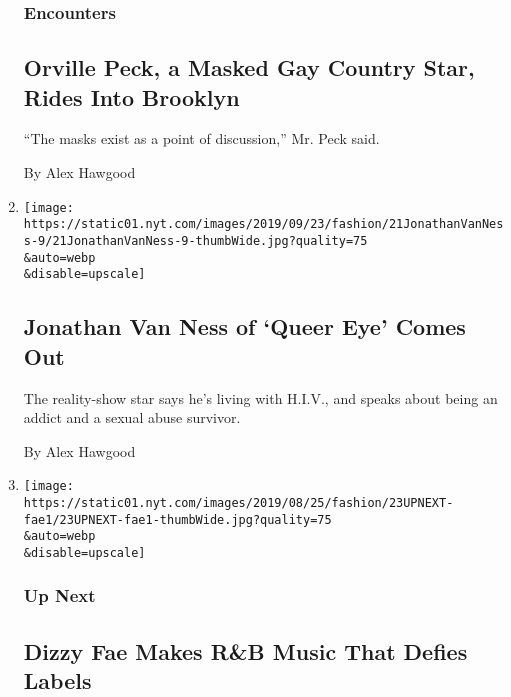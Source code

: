 \begin{enumerate}
  \hypertarget{encounters}{%
  \subsubsection{Encounters}\label{encounters}}

  \hypertarget{orville-peck-a-masked-gay-country-star-rides-into-brooklyn}{%
  \subsection{Orville Peck, a Masked Gay Country Star, Rides Into
  Brooklyn}\label{orville-peck-a-masked-gay-country-star-rides-into-brooklyn}}

  ``The masks exist as a point of discussion,'' Mr. Peck said.

  By Alex Hawgood
\item
  \href{/2019/09/21/style/jonathan-van-ness-hiv-memoir.html}{}

  \texttt{[image: https://static01.nyt.com/images/2019/09/23/fashion/21JonathanVanNess-9/21JonathanVanNess-9-thumbWide.jpg?quality=75\\\&auto=webp\\\&disable=upscale]}

  \hypertarget{jonathan-van-ness-of-queer-eye-comes-out}{%
  \subsection{Jonathan Van Ness of `Queer Eye' Comes
  Out}\label{jonathan-van-ness-of-queer-eye-comes-out}}

  The reality-show star says he's living with H.I.V., and speaks about
  being an addict and a sexual abuse survivor.

  By Alex Hawgood
\item
  \href{/2019/08/23/style/dizzy-fae-makes-rb-music-that-defies-labels.html}{}

  \texttt{[image: https://static01.nyt.com/images/2019/08/25/fashion/23UPNEXT-fae1/23UPNEXT-fae1-thumbWide.jpg?quality=75\\\&auto=webp\\\&disable=upscale]}

  \hypertarget{up-next-2}{%
  \subsubsection{Up Next}\label{up-next-2}}

  \hypertarget{dizzy-fae-makes-rb-music-that-defies-labels}{%
  \subsection{Dizzy Fae Makes R\&B Music That Defies
  Labels}\label{dizzy-fae-makes-rb-music-that-defies-labels}}


\end{enumerate}
